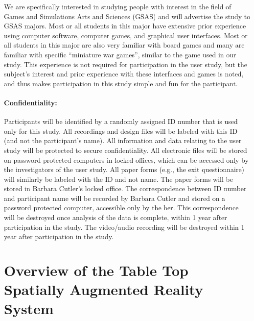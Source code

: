 \documentclass[10pt]{article}
\begin{document}
We are specifically interested in studying people with interest in the
field of Games and Simulations Arts and Sciences (GSAS) and will
advertise the study to GSAS majors.  Most or all students in this
major have extensive prior experience using computer software,
computer games, and graphical user interfaces.  Most or all students
in this major are also very familiar with board games and many are
familiar with specific ``miniature war games'', similar to the game
used in our study.  This experience is not required for participation
in the user study, but the subject's interest and prior experience
with these interfaces and games is noted, and thus makes participation
in this study simple and fun for the participant.  


\paragraph{Confidentiality:}
Participants will be identified by a randomly assigned ID number that
is used only for this study.  All recordings and design files will be
labeled with this ID (and not the participant's name).  All
information and data relating to the user study will be protected to
secure confidentiality.  All electronic files will be stored on
password protected computers in locked offices, which can be accessed
only by the investigators of the user study.  All paper forms (e.g.,
the exit questionnaire) will similarly be labeled with the ID and not
name.  The paper forms will be stored in Barbara Cutler's locked
office.  The correspondence between ID number and participant name
will be recorded by Barbara Cutler and stored on a password protected
computer, accessible only by the her.  This correspondence will be
destroyed once analysis of the data is complete, within 1 year after
participation in the study.  The video/audio recording will be
destroyed within 1 year after participation in the study.

\newpage

\section{Overview of the Table Top Spatially Augmented Reality System}

\end{document}
